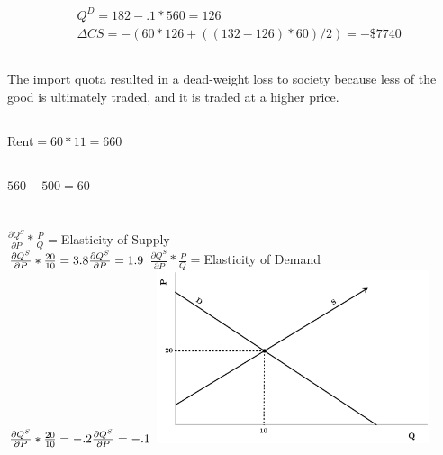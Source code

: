 \documentclass{article}
\begin{document}
	\subsection[f]{} 
\begin{align*}
&Q^D=182-.1*560=126\\
&\Delta CS=-(60*126+((132-126)*60)/2)=-\$7740
\end{align*}
	\subsection[g]{} 
The import quota resulted in a dead-weight loss to society because less of the good is ultimately traded, and it is traded at a higher price. %
	\subsection[h]{} 
Rent$=60*11=660$
	\subsection[i]{} 
$560-500=60$\\
\section[7]{}
	\subsection[a]{} 
$\frac{\partial{Q^S}}{\partial{P}}*\frac{P}{Q}=$Elasticity of Supply\\
$\frac{\partial{Q^S}}{\partial{P}}*\frac{20}{10}=3.8\\
\frac{\partial{Q^S}}{\partial{P}}=1.9\\$
$\frac{\partial{Q^S}}{\partial{P}}*\frac{P}{Q}=$Elasticity of Demand\\
$\frac{\partial{Q^S}}{\partial{P}}*\frac{20}{10}=-.2\\
\frac{\partial{Q^S}}{\partial{P}}=-.1\\$
\includegraphics[height=2in]{Charts/7a}
\end{document}
